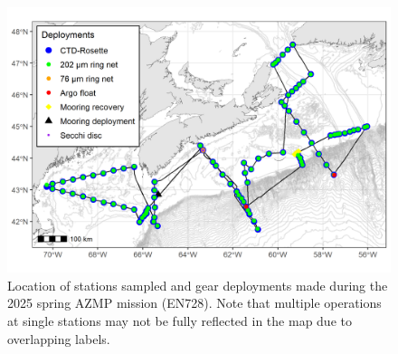 \documentclass[12pt]{article}\usepackage[]{graphicx}\usepackage[]{color}
\begin{document}
\begin{figure}[H]

{\centering \includegraphics{knitr-figs-pdf/figure1-1} 

}

\caption{Location of stations sampled and gear deployments made during the 2025 spring AZMP mission (EN728). Note that multiple operations at single stations may not be fully reflected in the map due to overlapping labels.}\label{fig:figure1}
\end{figure}
\clearpage
\end{document}
